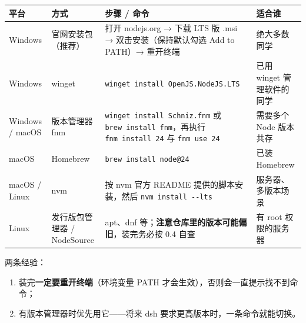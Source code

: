 {\def\LTcaptype{none} %
\begin{longtable}[]{@{}
  >{\raggedright\arraybackslash}p{}
  >{\raggedright\arraybackslash}p{}
  >{\raggedright\arraybackslash}p{}
  >{\raggedright\arraybackslash}p{}@{}}
\toprule\noalign{}
\begin{minipage}[b]{\linewidth}\raggedright
平台
\end{minipage} & \begin{minipage}[b]{\linewidth}\raggedright
方式
\end{minipage} & \begin{minipage}[b]{\linewidth}\raggedright
步骤 / 命令
\end{minipage} & \begin{minipage}[b]{\linewidth}\raggedright
适合谁
\end{minipage} \\
\midrule\noalign{}
\endhead
\bottomrule\noalign{}
\endlastfoot
Windows & 官网安装包（推荐） & 打开 nodejs.org → 下载 LTS 版 .msi →
双击安装（保持默认勾选 Add to PATH）→ 重开终端 & 绝大多数同学 \\
Windows & winget & \texttt{winget\ install\ OpenJS.NodeJS.LTS} & 已用
winget 管理软件的同学 \\
Windows / macOS & 版本管理器 fnm & \texttt{winget\ install\ Schniz.fnm}
或 \texttt{brew\ install\ fnm}，再执行 \texttt{fnm\ install\ 24} 与
\texttt{fnm\ use\ 24} & 需要多个 Node 版本共存 \\
macOS & Homebrew & \texttt{brew\ install\ node@24} & 已装 Homebrew \\
macOS / Linux & nvm & 按 nvm 官方 README 提供的脚本安装，然后
\texttt{nvm\ install\ -\/-lts} & 服务器、多版本场景 \\
Linux & 发行版包管理器 / NodeSource & apt、dnf
等；\textbf{注意仓库里的版本可能偏旧}，装完务必按 0.4 自查 & 有 root
权限的服务器 \\
\end{longtable}
}

两条经验：

\begin{enumerate}
\def\labelenumi{\arabic{enumi}.}
\tightlist
\item
  装完\textbf{一定要重开终端}（环境变量 PATH
  才会生效），否则会一直提示找不到命令；
\item
  有版本管理器时优先用它------将来 dsh
  要求更高版本时，一条命令就能切换。
\end{enumerate}


